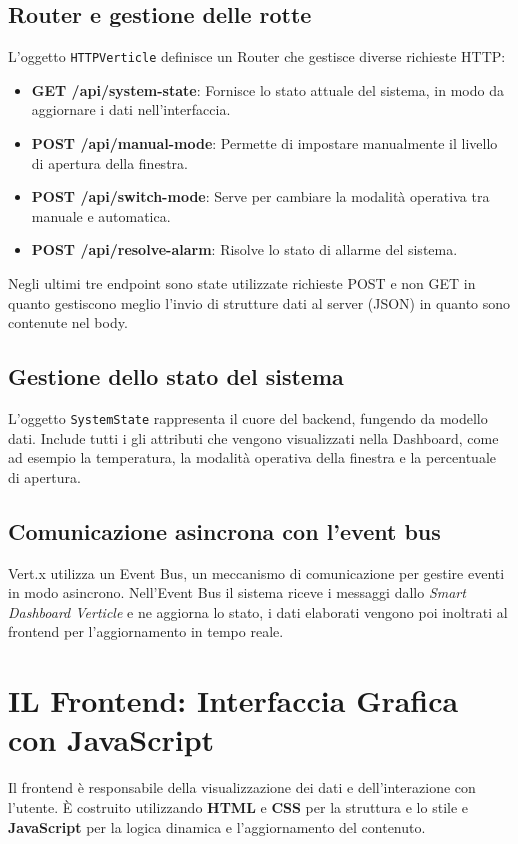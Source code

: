 \documentclass{report}
\begin{document}
\subsection{Router e gestione delle rotte}
L'oggetto \texttt{HTTPVerticle} definisce un Router che gestisce diverse richieste HTTP:
\begin{itemize}
    \item \textbf{GET /api/system-state}: Fornisce lo stato attuale del sistema, in modo da aggiornare i dati nell'interfaccia.
    \item \textbf{POST /api/manual-mode}: Permette di impostare manualmente il livello di apertura della finestra.
    \item \textbf{POST /api/switch-mode}: Serve per cambiare la modalità operativa tra manuale e automatica.
    \item \textbf{POST /api/resolve-alarm}: Risolve lo stato di allarme del sistema.
\end{itemize}
Negli ultimi tre endpoint sono state utilizzate richieste POST e non GET in quanto gestiscono meglio l'invio di strutture dati al server (JSON) in quanto sono contenute nel body.

\subsection{Gestione dello stato del sistema}
L'oggetto \texttt{SystemState} rappresenta il cuore del backend, fungendo da modello dati. Include tutti i gli attributi che vengono visualizzati nella Dashboard, come ad esempio la temperatura, la modalità operativa della finestra e la percentuale di apertura.

\subsection{Comunicazione asincrona con l’event bus}
Vert.x utilizza un Event Bus, un meccanismo di comunicazione per gestire eventi in modo asincrono. Nell'Event Bus il sistema riceve i messaggi dallo \textit{Smart Dashboard Verticle} e ne aggiorna lo stato, i dati elaborati vengono poi inoltrati al frontend per l'aggiornamento in tempo reale.

\section{IL Frontend: Interfaccia Grafica con JavaScript}
Il frontend è responsabile della visualizzazione dei dati e dell’interazione con l’utente. È costruito utilizzando \textbf{HTML} e \textbf{CSS} per la struttura e lo stile e \textbf{JavaScript} per la logica dinamica e l’aggiornamento del contenuto.
\end{document}
